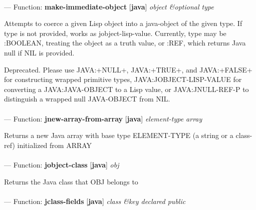 \paragraph{}
\label{JAVA:MAKE-IMMEDIATE-OBJECT}
--- Function: \textbf{make-immediate-object} [\textbf{java}] \textit{object \&optional type}

\begin{adjustwidth}{5em}{5em}
Attempts to coerce a given Lisp object into a java-object of the
given type.  If type is not provided, works as jobject-lisp-value.
Currently, type may be :BOOLEAN, treating the object as a truth value,
or :REF, which returns Java null if NIL is provided.

Deprecated.  Please use JAVA:+NULL+, JAVA:+TRUE+, and JAVA:+FALSE+ for
constructing wrapped primitive types, JAVA:JOBJECT-LISP-VALUE for converting a
JAVA:JAVA-OBJECT to a Lisp value, or JAVA:JNULL-REF-P to distinguish a wrapped
null JAVA-OBJECT from NIL.
\end{adjustwidth}

\paragraph{}
\label{JAVA:JNEW-ARRAY-FROM-ARRAY}
--- Function: \textbf{jnew-array-from-array} [\textbf{java}] \textit{element-type array}

\begin{adjustwidth}{5em}{5em}
Returns a new Java array with base type ELEMENT-TYPE (a string or a class-ref)
   initialized from ARRAY
\end{adjustwidth}

\paragraph{}
\label{JAVA:JOBJECT-CLASS}
--- Function: \textbf{jobject-class} [\textbf{java}] \textit{obj}

\begin{adjustwidth}{5em}{5em}
Returns the Java class that OBJ belongs to
\end{adjustwidth}

\paragraph{}
\label{JAVA:JCLASS-FIELDS}
--- Function: \textbf{jclass-fields} [\textbf{java}] \textit{class \&key declared public}

